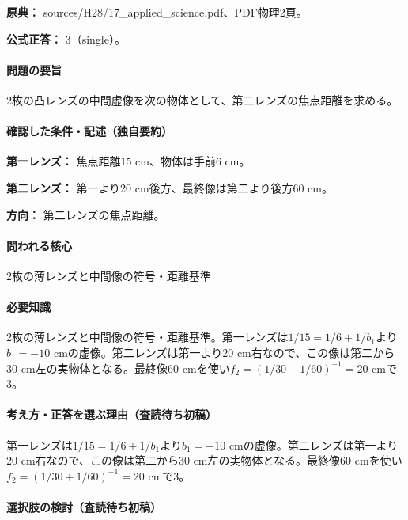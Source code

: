 \noindent\textbf{原典：} sources/H28/17\_applied\_science.pdf、PDF物理2頁。

\textbf{公式正答：} 3（single）。

\paragraph{問題の要旨} 2枚の凸レンズの中間虚像を次の物体として、第二レンズの焦点距離を求める。

\paragraph{確認した条件・記述（独自要約）}\mbox{}\par

\noindent\textbf{第一レンズ：} 焦点距離15 cm、物体は手前6 cm。\par

\noindent\textbf{第二レンズ：} 第一より20 cm後方、最終像は第二より後方60 cm。\par

\noindent\textbf{方向：} 第二レンズの焦点距離。\par

\paragraph{問われる核心} 2枚の薄レンズと中間像の符号・距離基準

\paragraph{必要知識} 2枚の薄レンズと中間像の符号・距離基準。第一レンズは\(1/15=1/6+1/b_1\)より\(b_1=-10\) cmの虚像。第二レンズは第一より20 cm右なので、この像は第二から30 cm左の実物体となる。最終像60 cmを使い\(f_2=(1/30+1/60)^{-1}=20\) cmで3。

\paragraph{考え方・正答を選ぶ理由（査読待ち初稿）} 第一レンズは\(1/15=1/6+1/b_1\)より\(b_1=-10\) cmの虚像。第二レンズは第一より20 cm右なので、この像は第二から30 cm左の実物体となる。最終像60 cmを使い\(f_2=(1/30+1/60)^{-1}=20\) cmで3。

\paragraph{選択肢の検討（査読待ち初稿）}\mbox{}\par

